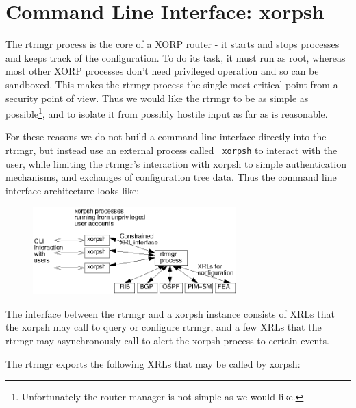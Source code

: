\documentclass[11pt]{article}
\begin{document}
\newpage

\section{Command Line Interface: xorpsh}

The rtrmgr process is the core of a XORP router - it starts and stops
processes and keeps track of the configuration.  To do its task, it
must run as root, whereas most other XORP processes don't need
privileged operation and so can be sandboxed.  This makes the rtrmgr
process the single most critical point from a security point of view.
Thus we would like the rtrmgr to be as simple as
possible\footnote{Unfortunately the router manager is not simple as we
would like.}, and to isolate it from possibly hostile input as far as
is reasonable.

For these reasons we do not build a command line interface directly
into the rtrmgr, but instead use an external process called {\tt
xorpsh} to interact with the user, while limiting the rtrmgr's
interaction with xorpsh to simple authentication mechanisms, and
exchanges of configuration tree data.  Thus the command line interface
architecture looks like:

\begin{figure}[htb]
\centerline{\includegraphics[width=0.7\textwidth]{figs/xorpsh}}
\vspace{.05in}
\end{figure}

The interface between the rtrmgr and a xorpsh instance consists of
XRLs that the xorpsh may call to query or configure rtrmgr, and a few
XRLs that the rtrmgr may asynchronously call to alert the xorpsh
process to certain events.

The rtrmgr exports the following XRLs that may be called by xorpsh:
\end{document}
